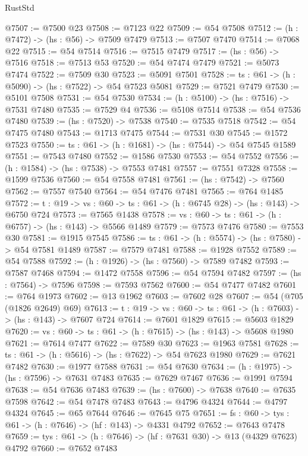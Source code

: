 \begin{lexlean}{RustStd}
\begin{coremodule}
@7507 := @7500 @23
@7508 := @7123 @22
@7509 := @54 @7508
@7512 := (h : @7472) -> (hs : @56) -> @7509 @7479
@7513 := @7507 @7470
@7514 := @7068 @22
@7515 := @54 @7514
@7516 := @7515 @7479
@7517 := (hs : @56) -> @7516
@7518 := @7513 @53
@7520 := @54 @7474 @7479
@7521 := @5073 @7474
@7522 := @7509 @30
@7523 := @5091 @7501
@7528 := {ts : @61} -> (h : @5090) -> (hs : @7522) -> @54 @7523 @5081
@7529 := @7521 @7479
@7530 := @5101 @7508
@7531 := @54 @7530
@7534 := (h : @5100) -> (hs : @7516) -> @7531 @7480
@7535 := @7529 @4
@7536 := @5108 @7514
@7538 := @54 @7536 @7480
@7539 := (hs : @7520) -> @7538
@7540 := @7535 @7518
@7542 := @54 @7475 @7480
@7543 := @1713 @7475
@7544 := @7531 @30
@7545 := @1572 @7523
@7550 := {ts : @61} -> (h : @1681) -> (hs : @7544) -> @54 @7545 @1589
@7551 := @7543 @7480
@7552 := @1586 @7530
@7553 := @54 @7552
@7556 := (h : @1584) -> (hs : @7538) -> @7553 @7481
@7557 := @7551 @7328
@7558 := @1599 @7536
@7560 := @54 @7558 @7481
@7561 := (hs : @7542) -> @7560
@7562 := @7557 @7540
@7564 := @54 @7476 @7481
@7565 := @764 @1485
@7572 := {t : @19} -> {vs : @60} -> {ts : @61} -> (h : @6745 @28) -> (hs : @143) -> @6750 @724
@7573 := @7565 @1438
@7578 := {vs : @60} -> {ts : @61} -> (h : @6757) -> (hs : @143) -> @5566 @1489
@7579 := @7573 @7476
@7580 := @7553 @30
@7581 := @1915 @7545
@7586 := {ts : @61} -> (h : @5574) -> (hs : @7580) -> @54 @7581 @1489
@7587 := @7579 @7481
@7588 := @1928 @7552
@7589 := @54 @7588
@7592 := (h : @1926) -> (hs : @7560) -> @7589 @7482
@7593 := @7587 @7468
@7594 := @1472 @7558
@7596 := @54 @7594 @7482
@7597 := (hs : @7564) -> @7596
@7598 := @7593 @7562
@7600 := @54 @7477 @7482
@7601 := @764 @1973
@7602 := @13 @1962
@7603 := @7602 @28
@7607 := @54 (@705 (@1826 @2649) @69)
@7613 := {t : @19} -> {vs : @60} -> {ts : @61} -> (h : @7603) -> (hs : @143) -> @7607 @724
@7614 := @7601 @1829
@7615 := @5603 @1829
@7620 := {vs : @60} -> {ts : @61} -> (h : @7615) -> (hs : @143) -> @5608 @1980
@7621 := @7614 @7477
@7622 := @7589 @30
@7623 := @1963 @7581
@7628 := {ts : @61} -> (h : @5616) -> (hs : @7622) -> @54 @7623 @1980
@7629 := @7621 @7482
@7630 := @1977 @7588
@7631 := @54 @7630
@7634 := (h : @1975) -> (hs : @7596) -> @7631 @7483
@7635 := @7629 @7467
@7636 := @1991 @7594
@7638 := @54 @7636 @7483
@7639 := (hs : @7600) -> @7638
@7640 := @7635 @7598
@7642 := @54 @7478 @7483
@7643 := @4796 @4324
@7644 := @4797 @4324
@7645 := @65 @7644
@7646 := @7645 @75
@7651 := {fs : @60} -> {tys : @61} -> (h : @7646) -> (hf : @143) -> @4331 @4792
@7652 := @7643 @7478
@7659 := {tys : @61} -> (h : @7646) -> (hf : @7631 @30) -> @13 (@4329 @7623) @4792
@7660 := @7652 @7483

\end{coremodule}
\end{lexlean}
